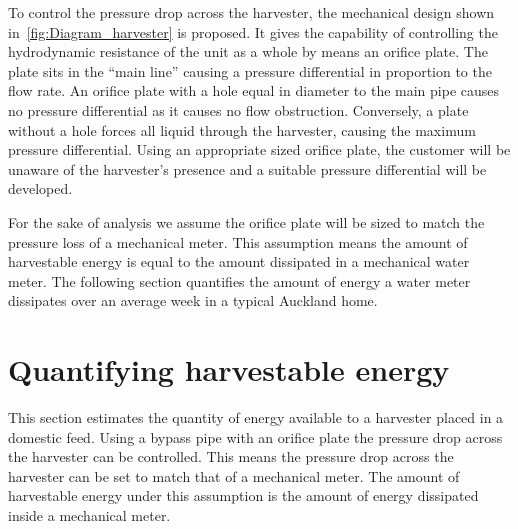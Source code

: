     To control the pressure drop across the harvester, the mechanical design shown in~\cref{fig:Diagram_harvester} is proposed.
    It gives the capability of controlling the hydrodynamic resistance of the unit as a whole by means an orifice plate.
    The plate sits in the ``main line'' causing a pressure differential in proportion to the flow rate.
    An orifice plate with a hole equal in diameter to the main pipe causes no pressure differential as it causes no flow obstruction.
    Conversely, a plate without a hole forces all liquid through the harvester, causing the maximum pressure differential.
    Using an appropriate sized orifice plate, the customer will be unaware of the harvester's presence and a suitable pressure differential will be developed.
    
    For the sake of analysis we assume the orifice plate will be sized to match the pressure loss of a mechanical meter.
    This assumption means the amount of harvestable energy is equal to the amount dissipated in a mechanical water meter.
    The following section quantifies the amount of energy a water meter dissipates over an average week in a typical Auckland home.


  \section{Quantifying harvestable energy} 

    This section estimates the quantity of energy available to a harvester placed in a domestic feed.
    Using a bypass pipe with an orifice plate the pressure drop across the harvester can be controlled.
    This means the pressure drop across the harvester can be set to match that of a mechanical meter.
    The amount of harvestable energy under this assumption is the amount of energy dissipated inside a mechanical meter.

